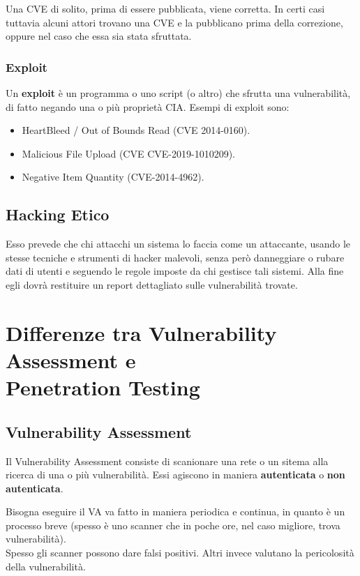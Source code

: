 \documentclass{article}
\begin{document}
Una CVE di solito, prima di essere pubblicata, viene corretta. In certi casi tuttavia alcuni attori trovano una CVE e la pubblicano prima della correzione, oppure nel caso che essa sia stata sfruttata.

\subsubsection{Exploit}
Un \textbf{exploit} è un programma o uno script (o altro) che sfrutta una vulnerabilità, di fatto negando una o più proprietà CIA. Esempi di exploit sono:
\begin{itemize}
    \item HeartBleed / Out of Bounds Read (CVE 2014-0160).
    \item Malicious File Upload (CVE CVE-2019-1010209).
    \item Negative Item Quantity (CVE-2014-4962).
\end{itemize}

\subsection{Hacking Etico}
Esso prevede che chi attacchi un sistema lo faccia come un attaccante, usando le stesse tecniche e strumenti di hacker malevoli, senza però danneggiare o rubare dati di utenti e seguendo le regole imposte da chi gestisce tali sistemi.
Alla fine egli dovrà restituire un report dettagliato sulle vulnerabilità trovate.
\newpage
\section{Differenze tra Vulnerability Assessment e\\ Penetration Testing}
\subsection{Vulnerability Assessment}
Il Vulnerability Assessment consiste di scanionare una rete o un sitema alla ricerca di una o più vulnerabilità. Essi agiscono in maniera \textbf{autenticata} o \textbf{non autenticata}.

Bisogna eseguire il VA va fatto in maniera periodica e continua, in quanto è un processo breve (spesso è uno scanner che in poche ore, nel caso migliore, trova vulnerabilità).\\
Spesso gli scanner possono dare falsi positivi. Altri invece valutano la pericolosità della vulnerabilità.
\end{document}
